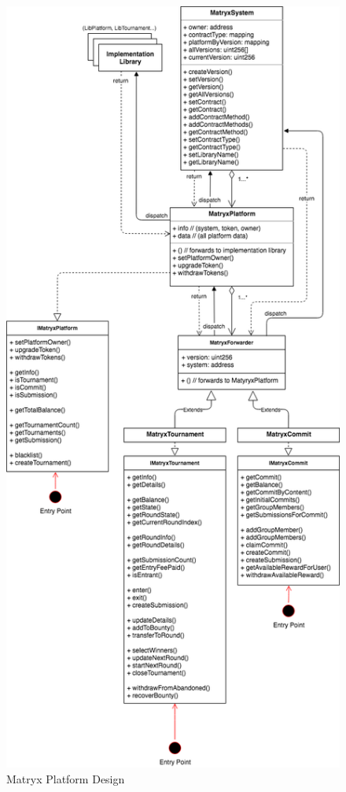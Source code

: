 \documentclass[a4paper, 10pt, conference]{ieeeconf}      %
\begin{document}
\begin{figure}
\caption{Matryx Platform Design}
\bigskip
\label{Platformdesign}
\centering
\includegraphics[scale = .5]{../Figures/MatryxArchitecture2018-MatryxPlatform.png}
\end{figure}
\end{document}
